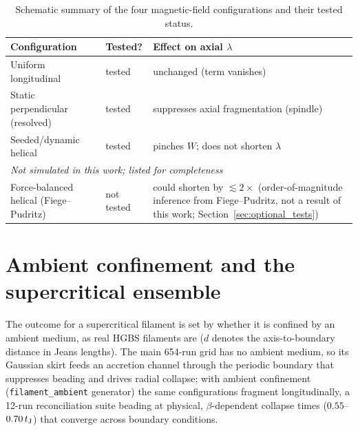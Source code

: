 \documentclass[usenatbib,twoside,twocolumn]{mnras}
\begin{document}
\begin{table}
\caption{Schematic summary of the four magnetic-field configurations and their tested status.}
\label{tab:magcases}
\footnotesize
\setlength{\tabcolsep}{4pt}
\begin{tabular}{@{}p{2.9cm}lp{3.0cm}@{}}
\toprule
Configuration & Tested? & Effect on axial $\lambda$ \\
\midrule
Uniform longitudinal & tested & unchanged (term vanishes) \\
Static perpendicular (resolved) & tested & suppresses axial fragmentation (spindle) \\
Seeded/dynamic helical & tested & pinches $W$; does not shorten $\lambda$ \\
\midrule
\multicolumn{3}{l}{\emph{Not simulated in this work; listed for completeness}}\\
Force-balanced helical (Fiege--Pudritz) & not tested & could shorten by $\lesssim2\times$ (order-of-magnitude inference from Fiege--Pudritz, not a result of this work; Section~\ref{sec:optional_tests}) \\
\bottomrule
\end{tabular}
\end{table}


\section{Ambient confinement and the supercritical ensemble}
\label{sec:ambient}


The outcome for a supercritical filament is set by whether it is confined by an ambient medium, as real HGBS filaments are ($d$ denotes the axis-to-boundary distance in Jeans lengths). The main 654-run grid has no ambient medium, so its Gaussian skirt feeds an accretion channel through the periodic boundary that suppresses beading and drives radial collapse; with ambient confinement (\texttt{filament\_ambient} generator) the same configurations fragment longitudinally, a 12-run reconciliation suite beading at physical, $\beta$-dependent collapse times ($0.55$--$0.70\,t_{\rm J}$) that converge across boundary conditions.
\end{document}
